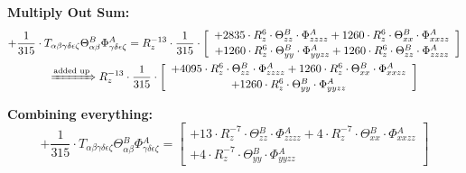 \documentclass{article}
\begin{document}
\textbf{Multiply Out Sum:}
\begin{subequations}\begin{gather}
+ \frac{1}{315} \cdot T_{\alpha{}\beta{}\gamma{}\delta{}\epsilon{}\zeta{}} \Theta{}^{B}_{\alpha{}\beta{}} \Phi{}^{A}_{\gamma{}\delta{}\epsilon{}\zeta{}} = R_{z}^{-13} \cdot \frac{1}{315} \cdot  \left[ \begin{array}{c} 
 		+ 2835 \cdot R_{z}^{6} \cdot \Theta{}^{B}_{zz} \cdot \Phi{}^{A}_{zzzz}+ 1260 \cdot R_{z}^{6} \cdot \Theta{}^{B}_{xx} \cdot \Phi{}^{A}_{xxzz} 
 \\[0.2em] 		 + 1260 \cdot R_{z}^{6} \cdot \Theta{}^{B}_{yy} \cdot \Phi{}^{A}_{yyzz}+ 1260 \cdot R_{z}^{6} \cdot \Theta{}^{B}_{zz} \cdot \Phi{}^{A}_{zzzz}
 \end{array}\right] 
\\ \xRightarrow{\text{added up}}
 R_{z}^{-13} \cdot \frac{1}{315} \cdot  \left[ \begin{array}{c} 
 		+ 4095 \cdot R_{z}^{6} \cdot \Theta{}^{B}_{zz} \cdot \Phi{}^{A}_{zzzz}+ 1260 \cdot R_{z}^{6} \cdot \Theta{}^{B}_{xx} \cdot \Phi{}^{A}_{xxzz} 
 \\[0.2em] 		 + 1260 \cdot R_{z}^{6} \cdot \Theta{}^{B}_{yy} \cdot \Phi{}^{A}_{yyzz}
 \end{array}\right] 
\end{gather}\end{subequations}


\textbf{Combining everything:}
\begin{equation}
+ \frac{1}{315} \cdot T_{\alpha{}\beta{}\gamma{}\delta{}\epsilon{}\zeta{}} \Theta{}^{B}_{\alpha{}\beta{}} \Phi{}^{A}_{\gamma{}\delta{}\epsilon{}\zeta{}} =  \left[ \begin{array}{c} 
 		+ 13 \cdot R_{z}^{-7} \cdot \Theta{}^{B}_{zz} \cdot \Phi{}^{A}_{zzzz}+ 4 \cdot R_{z}^{-7} \cdot \Theta{}^{B}_{xx} \cdot \Phi{}^{A}_{xxzz} 
 \\[0.2em] 		 + 4 \cdot R_{z}^{-7} \cdot \Theta{}^{B}_{yy} \cdot \Phi{}^{A}_{yyzz}
 \end{array}\right] 
\end{equation}
\end{document}
